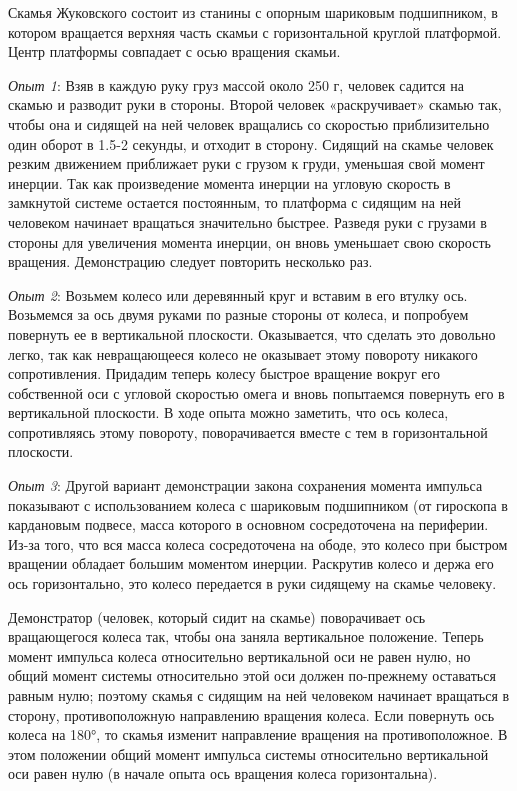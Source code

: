 \documentclass[All.tex]{subfiles}
\begin{document}
Скамья Жуковского состоит из станины с опорным шариковым подшипником, в котором вращается верхняя часть скамьи с горизонтальной круглой платформой.
Центр платформы совпадает с осью вращения скамьи.
		
	\textit{Опыт 1}:
Взяв в каждую руку груз массой около 250 г, человек садится на скамью и разводит руки в стороны.
Второй человек «раскручивает» скамью так, чтобы она и сидящей на ней человек вращались со скоростью приблизительно один оборот в 1.5-2 секунды, и отходит в сторону. 
Сидящий на скамье человек резким движением приближает руки с грузом к груди, уменьшая свой момент инерции.
Так как произведение момента инерции на угловую скорость в замкнутой системе остается постоянным, то платформа с сидящим на ней человеком начинает вращаться значительно быстрее. 
Разведя руки с грузами в стороны для увеличения момента инерции, он вновь уменьшает свою скорость вращения.
Демонстрацию следует повторить несколько раз.

\textit{Опыт 2}:
Возьмем колесо или деревянный круг и вставим в его втулку ось.
Возьмемся за ось двумя руками по разные стороны от колеса, и попробуем повернуть ее в вертикальной плоскости.
Оказывается, что сделать это довольно легко, так как невращающееся колесо не оказывает этому повороту никакого сопротивления. Придадим теперь колесу быстрое вращение вокруг его собственной оси с угловой скоростью омега и вновь попытаемся повернуть его в вертикальной плоскости. В ходе опыта можно заметить, что ось колеса, сопротивляясь этому повороту, поворачивается вместе с тем в горизонтальной плоскости.

\textit{Опыт 3}: Другой вариант демонстрации закона сохранения момента импульса показывают с использованием колеса с шариковым подшипником (от гироскопа в кардановым подвесе, масса которого в основном сосредоточена на периферии. 
Из-за того, что вся масса колеса сосредоточена на ободе, это колесо при быстром вращении обладает большим моментом инерции.
Раскрутив колесо и держа его ось горизонтально, это колесо передается в руки сидящему на скамье человеку.

Демонстратор (человек, который сидит на скамье) поворачивает ось вращающегося колеса так, чтобы она заняла вертикальное положение. 
Теперь момент импульса колеса относительно вертикальной оси не равен нулю, но общий момент системы относительно этой оси должен по-прежнему оставаться равным нулю; поэтому скамья с сидящим на ней человеком начинает вращаться в сторону, противоположную направлению вращения колеса.
Если повернуть ось колеса на 180°, то скамья изменит направление вращения на противоположное.
В этом положении общий момент импульса системы относительно вертикальной оси равен нулю (в начале опыта ось вращения колеса  горизонтальна).
	
\end{document}
